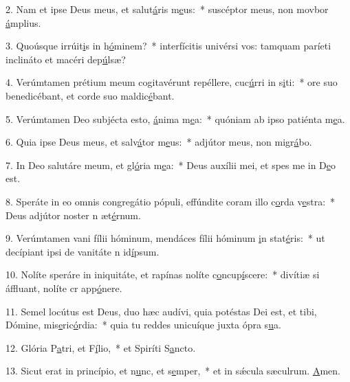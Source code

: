 2. Nam et ipse Deus meus, et salut\uline{á}ris m\uline{e}us:~* suscéptor meus, non movbor \uline{á}mplius.\par 
3. Quoúsque irrúit\uline{i}s in h\uline{ó}minem?~* interfícitis univérsi vos: tamquam paríeti inclináto et macéri dep\uline{ú}lsæ?\par 
4. Verúmtamen prétium meum cogitavérunt repéllere, cuc\uline{ú}rri in s\uline{i}ti:~* ore suo benedicébant, et corde suo maldic\uline{é}bant.\par 
5. Verúmtamen Deo subjécta esto, \uline{á}nima m\uline{e}a:~* quóniam ab ipso patiénta m\uline{e}a.\par 
6. Quia ipse Deus meus, et salv\uline{á}tor m\uline{e}us:~* adjútor meus, non migr\uline{á}bo.\par 
7. In Deo salutáre meum, et gl\uline{ó}ria m\uline{e}a:~* Deus auxílii mei, et spes me in D\uline{e}o est.\par 
8. Speráte in eo omnis congregátio pópuli, effúndite coram illo c\uline{o}rda v\uline{e}stra:~* Deus adjútor noster n æt\uline{é}rnum.\par 
9. Verúmtamen vani fílii hóminum, mendáces fílii hóminum \uline{i}n stat\uline{é}ris:~* ut decípiant ipsi de vanitáte n id\uline{í}psum.\par 
10. Nolíte speráre in iniquitáte, et rapínas nolíte c\uline{o}ncup\uline{í}scere:~* divítiæ si áffluant, nolíte cr app\uline{ó}nere.\par 
11. Semel locútus est Deus, duo hæc audívi, quia potéstas Dei est, et tibi, Dómine, mis\uline{e}ric\uline{ó}rdia:~* quia tu reddes unicuíque juxta ópra s\uline{u}a.\par 
12. Glória P\uline{a}tri, et F\uline{í}lio,~* et Spiríti S\uline{a}ncto.\par 
13. Sicut erat in princípio, et n\uline{u}nc, et s\uline{e}mper,~* et in sǽcula sæculrum. \uline{A}men.\par 
